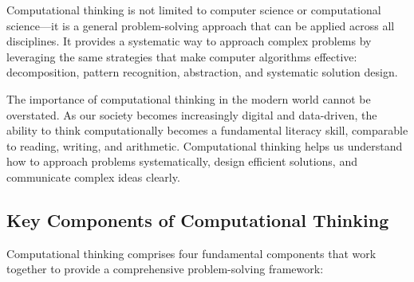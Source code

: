 Computational thinking is not limited to computer science or computational science—it is a general problem-solving approach that can be applied across all disciplines. It provides a systematic way to approach complex problems by leveraging the same strategies that make computer algorithms effective: decomposition, pattern recognition, abstraction, and systematic solution design.

The importance of computational thinking in the modern world cannot be overstated. As our society becomes increasingly digital and data-driven, the ability to think computationally becomes a fundamental literacy skill, comparable to reading, writing, and arithmetic. Computational thinking helps us understand how to approach problems systematically, design efficient solutions, and communicate complex ideas clearly.

\subsection{Key Components of Computational Thinking}

Computational thinking comprises four fundamental components that work together to provide a comprehensive problem-solving framework:


